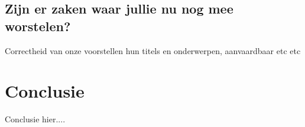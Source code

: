 \documentclass[fleqn,10pt]{voorstel}
\begin{document}
\subsection{Zijn er zaken waar jullie nu nog mee worstelen?}
Correctheid van onze voorstellen hun titels en onderwerpen, aanvaardbaar etc etc

\section{Conclusie}
Conclusie hier....
\end{document}
